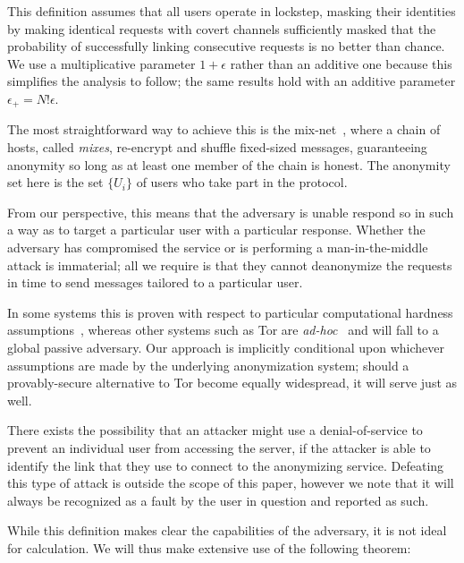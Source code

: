 \documentclass[USenglish]{llncs}
\begin{document}
This definition assumes that all users operate in lockstep,
masking their identities by making identical requests with covert channels
sufficiently masked that the probability of successfully linking
consecutive requests is no better than chance.  We use a multiplicative
parameter $1+\epsilon$ rather than an additive one because this simplifies
the analysis to follow; the same results hold with an additive parameter
$\epsilon_+ = N! \epsilon$.

The most straightforward
way to achieve this is the mix-net~\cite{chaum-mix}, where a chain of
hosts, called \emph{mixes}, re-encrypt and shuffle fixed-sized messages,
guaranteeing anonymity so long as at least one member of the chain is honest.  The
anonymity set here is the set $\{U_i\}$ of users who take part in the protocol.

From our perspective, this means that the adversary
is unable respond so in such a way as to target a particular user with a particular
response.  Whether the adversary has
compromised the service or is performing a man-in-the-middle attack
is immaterial; all we require is that they cannot
deanonymize the requests in time to send messages tailored to a particular
user.

In some systems this is proven with respect to particular computational hardness
assumptions~\cite{young-drunk-motorcyclist}, whereas other systems such as Tor
are \emph{ad-hoc}~\cite{camenisch-onion} and will fall to a global passive adversary.
Our approach is implicitly conditional upon whichever assumptions are
made by the underlying anonymization system; should a provably-secure alternative
to Tor become equally widespread, it will serve just as well.

There exists the possibility that an attacker might use a denial-of-service to prevent
an individual user from accessing the server, if the attacker is able to identify the link
that they use to connect to the anonymizing service.  Defeating this type of attack
is outside the scope of this paper, however we note that it will always be recognized
as a fault by the user in question and reported as such.

While this definition makes clear the capabilities of the adversary, it is
not ideal for calculation.  We will thus make extensive use of the following
theorem:
\end{document}
